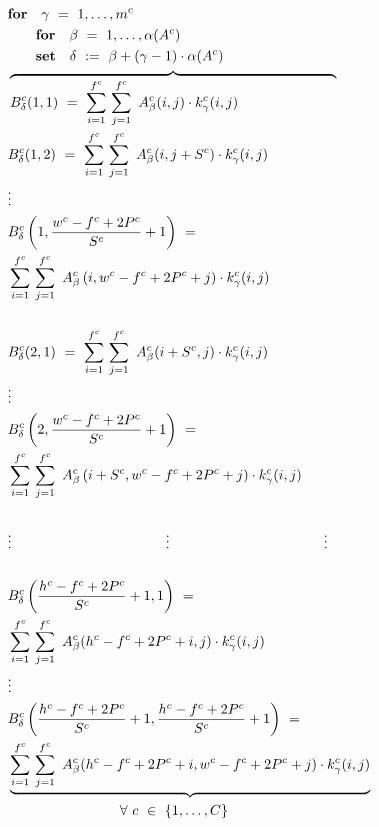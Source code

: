 \documentclass{article}
\begin{document}
\begin{align}
&\textbf{for} \quad \gamma \ = \ 1, \ldots, m^c \label{forallkernels} \\
&\qquad \textbf{for} \quad \beta \ = \ 1, \ldots, \alpha(A^c) \label{forallinputmaps}\\
&\qquad \textbf{set} \quad \delta \ := \ \beta + (\gamma - 1)\cdot \alpha(A^c) \label{foralloutputmaps}\\
&\overbrace{
B_\delta^c(1,1) \ = \ \sum_{i=1}^{f^c} \, \sum_{j=1}^{f^c} \ A_\beta^c(i,j) \cdot k_\gamma^c(i,j) \qquad \qquad \qquad \quad} \label{firstmap_firstkernel_rowone_columnone} \\
&B_\delta^c(1,2) \ = \ \sum_{i=1}^{f^c} \, \sum_{j=1}^{f^c} \ A_\beta^c(i,j+S^c) \cdot k_\gamma^c(i,j) \\
&\vdots \notag \\
&B_\delta^c \left(1, \frac{w^c-f^c+2P^c}{S^c}+1\right) \ = \notag \\ 
&\sum_{i=1}^{f^c} \, \sum_{j=1}^{f^c} \ A_\beta^c\left(i,{w^c-f^c+2P^c}+j\right) \cdot k_\gamma^c(i,j) \label{firstmap_firstkernel_rowone_columnlast} \\
&\rule{80mm}{.01pt} \notag \\
&B_\delta^c(2,1) \ = \ \sum_{i=1}^{f^c} \, \sum_{j=1}^{f^c} \ A_\beta^c(i+S^c,j) \cdot k_\gamma^c(i,j) \label{firstmap_firstkernel_rowtwo_columnone} \\
&\vdots \notag \\
&B_\delta^c \left(2, \frac{w^c-f^c+2P^c}{S^c}+1\right) \ = \notag \\ &\sum_{i=1}^{f^c} \, \sum_{j=1}^{f^c} \ A_\beta^c\left(i+S^c,{w^c-f^c+2P^c} +j\right) \cdot k_\gamma^c(i,j) \label{firstmap_firstkernel_rowtwo_columnlast}\\ 
&\rule{80mm}{.01pt} \notag \\
&\vdots \qquad \qquad \qquad \quad \qquad \qquad \vdots \qquad \qquad \qquad \qquad \quad \qquad \vdots \notag \\
&\rule{80mm}{.01pt} \notag \\
&B_\delta^c\left(\frac{h^c-f^c+2P^c}{S^c}+1,1\right) \ = \notag \\ &\sum_{i=1}^{f^c} \, \sum_{j=1}^{f^c} \ A_\beta^c(h^c-f^c+2P^c+i,j) \cdot k_\gamma^c(i,j) \label{firstmap_firstkernel_rowlast_columnone} \\
&\vdots \notag \\
&B_\delta^c\left(\frac{h^c-f^c+2P^c}{S^c}+1,\frac{h^c-f^c+2P^c}{S^c}+1\right) \ = \notag \\
&\underbrace{\sum_{i=1}^{f^c} \, \sum_{j=1}^{f^c} \ A_\beta^c(h^c-f^c+2P^c+i,w^c-f^c+2P^c +j) \cdot k_\gamma^c(i,j) \label{firstmap_firstkernel_rowlast_columnlast}} \\
&\qquad \qquad \qquad \qquad \forall \ c \ \in \ \{1, \ldots, C \} \notag
\end{align}
\end{document}
